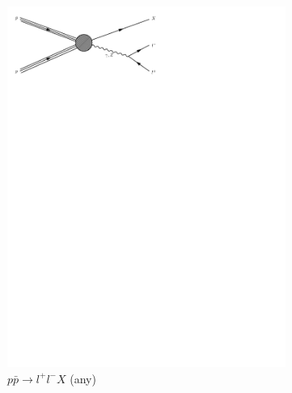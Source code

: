 \begin{figure}[h]
\begin{subfigure}[b]{0.3\textwidth}
    \includegraphics[trim={0.5cm 22cm 10cm 0cm},width=\textwidth]{../Diagrams/D4.pdf}
    \caption{$p\bar{p}\rightarrow l^+l^-X$ (any)}
    \label{fey:4}
  \end{subfigure}%
  ~
  \begin{subfigure}[b]{0.3\textwidth}

\end{subfigure}
\end{figure}
